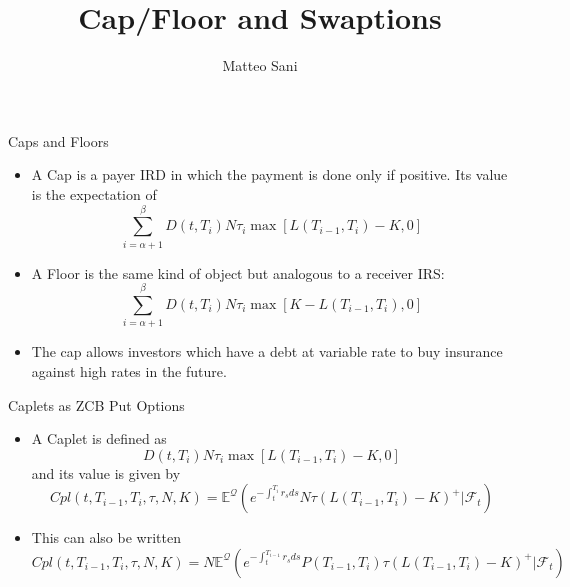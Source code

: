 \documentclass{beamer}
\title{Cap/Floor and Swaptions}
\author{Matteo Sani}
\begin{document}
	\begin{frame}[plain]
		\maketitle
	\end{frame}

\begin{frame}{Caps and Floors}
	\begin{itemize}
		\item A Cap is a payer IRD in which the payment is done only if positive. Its value is the expectation of 
		\begin{equation}
			\sum_{i=\alpha+1}^{\beta}D(t,T_i)N\tau_i\max\left[L(T_{i-1},T_i)-K,0\right]
		\end{equation} 
		\item A Floor is the same kind of object but analogous to a receiver IRS:
		\begin{equation}
			\sum_{i=\alpha+1}^{\beta}D(t,T_i)N\tau_i\max\left[K-L(T_{i-1},T_i),0\right]
		\end{equation} 
		\item The cap allows investors which have a debt at variable rate to buy insurance against high rates in the future.
	\end{itemize}
\end{frame}

\begin{frame}{Caplets as ZCB Put Options}
	\begin{itemize}
		\item A Caplet is defined as
		\begin{equation}
			D(t,T_i)N\tau_i\max\left[L(T_{i-1},T_i)-K,0\right]
		\end{equation} 
		and its value is given by
		\begin{equation}
			Cpl(t,T_{i-1},T_i,\tau,N,K)=\mathbb{E}^{\mathcal{Q}}\left(e^{-\int_t^{T_i}r_s ds}N\tau(L(T_{i-1},T_i)-K)^+ | \mathcal{F}_t\right)
		\end{equation}
		\item This can also be written
		\begin{equation}
			Cpl(t,T_{i-1},T_i,\tau,N,K)=N\mathbb{E}^{\mathcal{Q}}\left(e^{-\int_t^{T_{i-1}}r_s ds}P(T_{i-1},T_i)\tau(L(T_{i-1},T_i)-K)^+ | \mathcal{F}_t\right)
		\end{equation}
	\end{itemize}
\end{frame}
\end{document}
